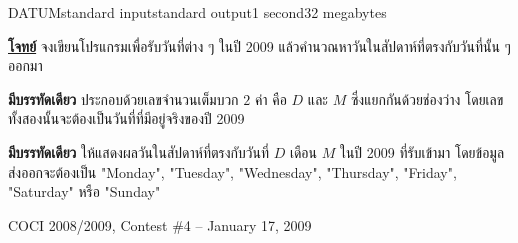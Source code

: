 \documentclass[11pt,a4paper]{article}
\begin{document}
\begin{problem}{DATUM}{standard input}{standard output}{1 second}{32 megabytes}

\underline{\textbf{โจทย์}} จงเขียนโปรแกรมเพื่อรับวันที่ต่าง ๆ ในปี 2009 แล้วคำนวณหาวันในสัปดาห์ที่ตรงกับวันที่นั้น ๆ ออกมา

\InputFile

\textbf{มีบรรทัดเดียว} ประกอบด้วยเลขจำนวนเต็มบวก $2$ ค่า คือ $D$ และ $M$ ซึ่งแยกกันด้วยช่องว่าง โดยเลขทั้งสองนั้นจะต้องเป็นวันที่ที่มีอยู่จริงของปี 2009

\OutputFile

\textbf{มีบรรทัดเดียว} ให้แสดงผลวันในสัปดาห์ที่ตรงกับวันที่ $D$ เดือน $M$ ในปี 2009 ที่รับเข้ามา โดยข้อมูลส่งออกจะต้องเป็น "Monday", "Tuesday", "Wednesday", "Thursday", "Friday", "Saturday" หรือ "Sunday"

\Examples

\begin{example}
%
%
%
\end{example}

\Source

COCI 2008/2009, Contest \#4 – January 17, 2009

\end{problem}
\end{document}
